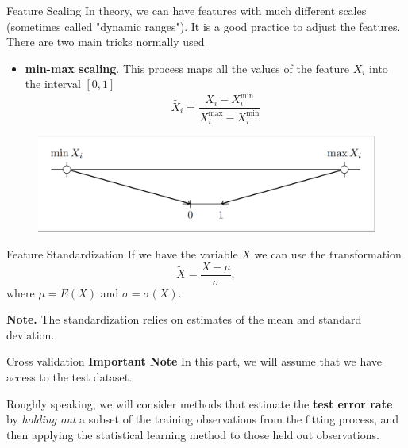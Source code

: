 \documentclass{beamer}
\begin{document}
\begin{frame}{Feature Scaling}
	In theory, we can have features with much different scales (sometimes called "dynamic ranges"). It is a good practice to adjust the features.  There are two main tricks normally used
	
	\begin{itemize}
		\item {\bf min-max scaling}. This process maps all the values of the feature $X_i$ into the interval $[0,1]$
		 \begin{equation*}
		 	\tilde{X_i} = \frac{X_i - X_i^{\min}}{X_i^{\max}-X_i^{\min}}
		 \end{equation*}
	\end{itemize}

\begin{figure}
	\centering
	\includegraphics[scale=0.35]{../../Figures/fig_minmaxmap.png}
\end{figure}	
	
\end{frame}
\begin{frame}{Feature Standardization}
	If we have the variable $X$ we can use the transformation 
	\begin{equation*}
		\tilde{X}= \frac{ X - \mu}{\sigma},
	\end{equation*}
where $\mu=E(X)$ and $\sigma=\sigma(X)$.

{\bf Note.} The standardization relies on estimates of the mean and standard deviation.

\end{frame}
\begin{frame}{Cross validation}
	{\Large \bf Important Note}
	In this part, we will assume that we have access to the test dataset. 
	
	Roughly speaking, we will consider methods that estimate the {\bf test error rate} by {\it holding out} a subset of the training observations from the fitting process, and then applying the statistical learning method to those held out observations. 
	
\end{frame}
\end{document}
